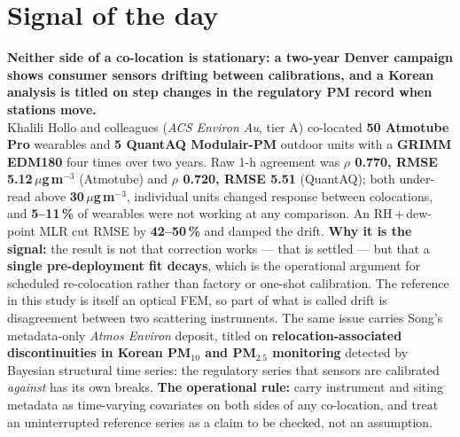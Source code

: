 \documentclass[10pt]{article}
\begin{document}
\vspace{6mm}

\section*{\sffamily\bfseries\color{Deep}Signal of the day}
\vspace{-1.5mm}{\color{Amber}\rule{\linewidth}{1.1pt}}\vspace{2.5mm}

\begin{keybox}
{\sffamily\bfseries\small\color{Deep}Neither side of a co-location is stationary: a two-year
Denver campaign shows consumer sensors drifting between calibrations, and a Korean analysis is
titled on step changes in the regulatory PM record when stations move.}\\[1.4mm]
\footnotesize
Khalili Hollo and colleagues (\textit{ACS Environ Au}, tier A) co-located \textbf{50 Atmotube
Pro} wearables and \textbf{5 QuantAQ Modulair-PM} outdoor units with a \textbf{GRIMM EDM180}
four times over two years. Raw 1-h agreement was \textbf{$\rho$ 0.770, RMSE 5.12\,$\mu$g\,m$^{-3}$}
(Atmotube) and \textbf{$\rho$ 0.720, RMSE 5.51} (QuantAQ); both under-read above
\textbf{30\,$\mu$g\,m$^{-3}$}, individual units changed response between colocations, and
\textbf{5--11\,\%} of wearables were not working at any comparison. An RH\,+\,dew-point MLR cut
RMSE by \textbf{42--50\,\%} and damped the drift. \textbf{Why it is the signal:} the result is
not that correction works --- that is settled --- but that a \textbf{single pre-deployment fit
decays}, which is the operational argument for scheduled re-colocation rather than
factory or one-shot calibration. The reference in this study is itself an optical FEM, so part
of what is called drift is disagreement between two scattering instruments. The same issue
carries Song's metadata-only \textit{Atmos Environ} deposit, titled on \textbf{relocation-associated
discontinuities in Korean PM$_{10}$ and PM$_{2.5}$ monitoring} detected by Bayesian structural
time series: the regulatory series that sensors are calibrated \emph{against} has its own
breaks. \textbf{The operational rule:} carry instrument and siting metadata as time-varying
covariates on both sides of any co-location, and treat an uninterrupted reference series as a
claim to be checked, not an assumption.\par
\end{keybox}
\end{document}

